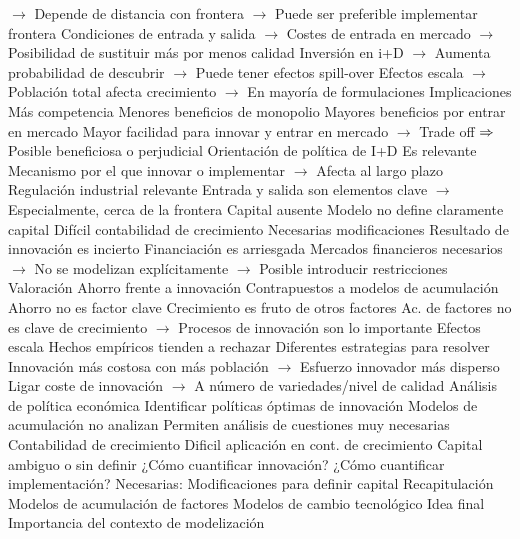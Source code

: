 \documentclass{nuevotema}
\begin{document}
\begin{esquemal}
				\4[] $\to$ Depende de distancia con frontera
				\4[] $\to$ Puede ser preferible implementar frontera
				\4[] Condiciones de entrada y salida
				\4[] $\to$ Costes de entrada en mercado
				\4[] $\to$ Posibilidad de sustituir más por menos calidad
				\4[] Inversión en i+D
				\4[] $\to$ Aumenta probabilidad de descubrir
				\4[] $\to$ Puede tener efectos spill-over
				\4[] Efectos escala
				\4[] $\to$ Población total afecta crecimiento
				\4[] $\to$ En mayoría de formulaciones
			\3 Implicaciones
				\4 Más competencia
				\4[] Menores beneficios de monopolio
				\4[] Mayores beneficios por entrar en mercado
				\4[] Mayor facilidad para innovar y entrar en mercado
				\4[] $\to$ Trade off
				\4[] $\Rightarrow$ Posible beneficiosa o perjudicial
				\4 Orientación de política de I+D
				\4[] Es relevante
				\4[] Mecanismo por el que innovar o implementar
				\4[] $\to$ Afecta al largo plazo
				\4 Regulación industrial relevante
				\4[] Entrada y salida son elementos clave
				\4[] $\to$ Especialmente, cerca de la frontera
				\4 Capital ausente
				\4[] Modelo no define claramente capital
				\4[] Difícil contabilidad de crecimiento
				\4[] Necesarias modificaciones
				\4 Resultado de innovación es incierto
				\4[] Financiación es arriesgada
				\4[] Mercados financieros necesarios
				\4[] $\to$ No se modelizan explícitamente
				\4[] $\to$ Posible introducir restricciones
		\2 Valoración
			\3 Ahorro frente a innovación
				\4 Contrapuestos a modelos de acumulación
				\4 Ahorro no es factor clave
				\4[] Crecimiento es fruto de otros factores
				\4[] Ac. de factores no es clave de crecimiento
				\4[] $\to$ Procesos de innovación son lo importante
			\3 Efectos escala
				\4 Hechos empíricos tienden a rechazar
				\4 Diferentes estrategias para resolver
				\4[] Innovación más costosa con más población
				\4[] $\to$ Esfuerzo innovador más disperso
				\4[] Ligar coste de innovación
				\4[] $\to$ A número de variedades/nivel de calidad
			\3 Análisis de política económica
				\4 Identificar políticas óptimas de innovación
				\4[] Modelos de acumulación no analizan
				\4 Permiten análisis de cuestiones muy necesarias
			\3 Contabilidad de crecimiento
				\4 Dificil aplicación en cont. de crecimiento
				\4 Capital ambiguo o sin definir
				\4[] ¿Cómo cuantificar innovación?
				\4[] ¿Cómo cuantificar implementación?
				\4 Necesarias:
				\4[] Modificaciones para definir capital
	\1[] 
		\2 Recapitulación
			\3 Modelos de acumulación de factores
			\3 Modelos de cambio tecnológico
		\2 Idea final
			\3 Importancia del contexto de modelización

\end{esquemal}
\end{document}
